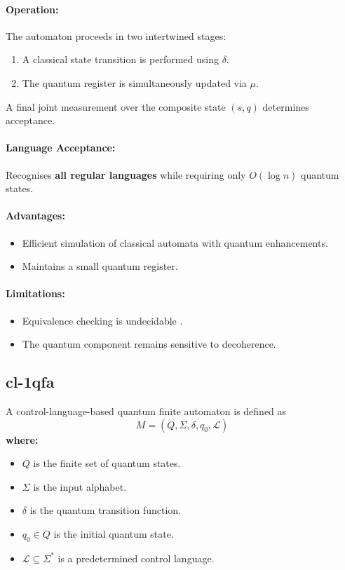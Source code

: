 \paragraph{Operation:}  
The automaton proceeds in two intertwined stages:
\begin{enumerate}
    \item A classical state transition is performed using \( \delta \).
    \item The quantum register is simultaneously updated via \( \mu \).
\end{enumerate}
A final joint measurement over the composite state \( (s, q) \) determines acceptance.

\paragraph{Language Acceptance:}  
Recognises \textbf{all regular languages} while requiring only \( O(\log n) \) quantum states.

\paragraph{Advantages:}
\begin{itemize}
    \item Efficient simulation of classical automata with quantum enhancements.
    \item Maintains a small quantum register.
\end{itemize}

\paragraph{Limitations:}
\begin{itemize}
    \item Equivalence checking is undecidable \cite{hirvensalo2008}.
    \item The quantum component remains sensitive to decoherence.
\end{itemize}
\cite{qiu2009}

\subsection{\acrfull{cl-1qfa}}
\label{subsec:cl-1qfa}
\begin{definition}
A control-language-based quantum finite automaton is defined as 
\[
M = (Q, \Sigma, \delta, q_0, \mathcal{L})
\]
\textbf{where:}
\begin{itemize}
    \item \( Q \) is the finite set of quantum states.
    \item \( \Sigma \) is the input alphabet.
    \item \( \delta \) is the quantum transition function.
    \item \( q_0 \in Q \) is the initial quantum state.
    \item \( \mathcal{L} \subseteq \Sigma^* \) is a predetermined control language.
\end{itemize}
\end{definition}

